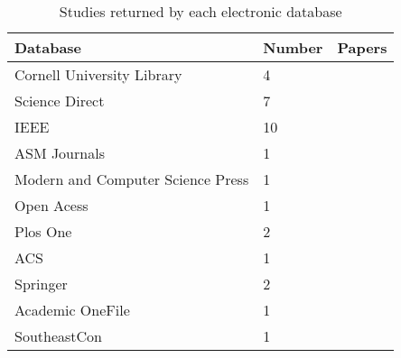 \begin{table}[h]
\caption {Studies returned by each electronic database} \label{tab:estudos} 
\begin{tabular}{|l|l|l|}
\hline
\rowcolor[HTML]{EFEFEF} 
\textbf{Database}     & \textbf{Number} & \textbf{Papers} \\ \hline
Cornell University Library & 4                   &
\begin{minipage}[t]{0.12\textwidth}
\cite{Rajpurkar2017} \cite{Mehrjou} \cite{Gueorguieva2013} \cite{Kouwaye}
\end{minipage}
\\ \hline
Science Direct             & 7                   & 
\begin{minipage}[t]{0.12\textwidth}
\cite{Poostchi2018} \cite{Das2013} \cite{Savkare2012} \cite{Mas2015} \cite{Bhowmick2013} \cite{Diaz2009} \cite{Somasekar2015} \cite{Sudheer2014}          
\end{minipage}
\\ \hline
IEEE             & 10                   &  
\begin{minipage}[t]{0.12\textwidth}
\cite{Bibin2017} \cite{Muralidharan2016} \cite{Pattanaik2017} \cite{Abidin2017} \cite{Zhang2016} \cite{Kareem2012} \cite{Nugroho2017} \cite{Mehanian2017} \cite{Liang2017} \cite{Dong2017}    
\end{minipage}
\\ \hline
ASM Journals          & 1                   &       \cite{Eshel2017}         \\ \hline
Modern and Computer Science Press          & 1                   &       \cite{A.Abisoye2018}         \\ \hline
Open Acess        & 1                   &       \cite{Kalantarmotamedi2018}         \\ \hline
Plos One        & 2                   &       \cite{Park2016}\cite{Linder2014}        \\ \hline
ACS        & 1                   &       \cite{Verras2017}       \\ \hline
Springer        & 2                   &       \cite{Devi2018}\cite{Abbas2018}       \\ \hline
Academic OneFile       & 1                   &     \cite{Subramaniam2011}       \\ \hline
SoutheastCon      & 1                   &     \cite{Dong2017a}      \\ \hline
\end{tabular}
\end{table}